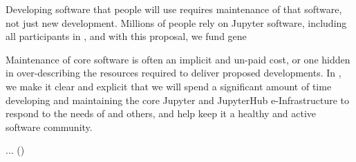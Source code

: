 \begin{task}[
  title=Maintenance of Jupyter and JupyterHub,
  id=maintenance,
  lead=SRL,
  PM=48,
  wphases={0-48},
  partners={XXX,SRL}
]
  Developing software that people will use requires maintenance of that software,
  not just new development.
  Millions of people rely on Jupyter software,
  including all participants in \TheProject,
  and with this proposal, we fund gene

  Maintenance of core software is often an implicit and un-paid cost,
  or one hidden in over-describing the resources required to deliver
  proposed developments.
  In \TheProject, we make it clear and explicit that we will spend a significant amount
  of time developing and maintaining the core Jupyter and JupyterHub
  e-Infrastructure to respond to the needs of \TheProject and others,
  and help keep it a healthy and active software community.

  \begin{compactitem}
  \item ...
    ()
  \end{compactitem}
\end{task}
